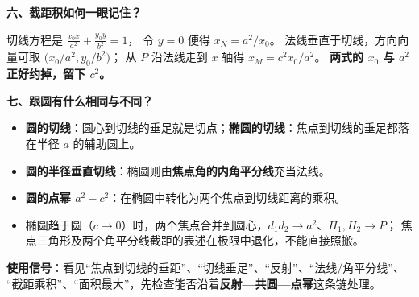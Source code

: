 \begin{explanationbox}
\textbf{六、截距积如何一眼记住？}

切线方程是 $\frac{x_0x}{a^2}+\frac{y_0y}{b^2}=1$，
令 $y=0$ 便得 $x_N=a^2/x_0$。
法线垂直于切线，方向向量可取
$\bigl(x_0/a^2,y_0/b^2\bigr)$；
从 $P$ 沿法线走到 $x$ 轴得
$x_M=c^2x_0/a^2$。
\textbf{两式的 $x_0$ 与 $a^2$ 正好约掉，留下 $c^2$。}

\textbf{七、跟圆有什么相同与不同？}
\begin{itemize}
\item \textbf{圆的切线}：圆心到切线的垂足就是切点；\textbf{椭圆的切线}：焦点到切线的垂足都落在半径 $a$ 的辅助圆上。
\item \textbf{圆的半径垂直切线}：椭圆则由\textbf{焦点角的内角平分线}充当法线。
\item \textbf{圆的点幂 $a^2-c^2$}：在椭圆中转化为两个焦点到切线距离的乘积。
\item 椭圆趋于圆（$c\to0$）时，两个焦点合并到圆心，$d_1d_2\to a^2$、$H_1,H_2\to P$；
焦点三角形及两个角平分线截距的表述在极限中退化，不能直接照搬。
\end{itemize}

\textbf{使用信号}：看见``焦点到切线的垂距''、``切线垂足''、``反射''、``法线/角平分线''、
``截距乘积''、``面积最大''，先检查能否沿着\textbf{反射—共圆—点幂}这条链处理。
\end{explanationbox}
